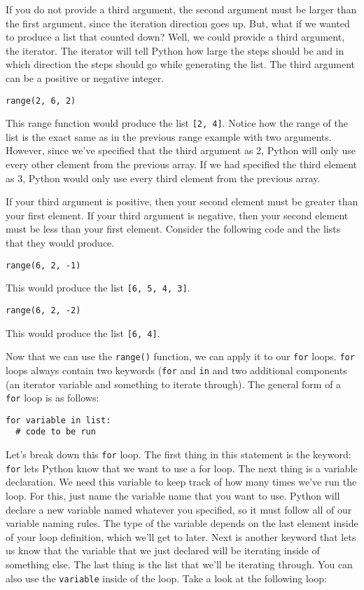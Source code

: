 If you do not provide a third argument, the second argument must be larger than the first argument, since the iteration direction goes up. But, what if we wanted to produce a list that counted down? Well, we could provide a third argument, the iterator. The iterator will tell Python how large the steps should be and in which direction the steps should go while generating the list. The third argument can be a positive or negative integer.\par
\begin{lstlisting}[style=pippython]
range(2, 6, 2)
\end{lstlisting}
This range function would produce the list \verb|[2, 4]|. Notice how the range of the list is the exact same as in the previous range example with two arguments. However, since we've specified that the third argument as 2, Python will only use every other element from the previous array. If we had specified the third element as 3, Python would only use every third element from the previous array.\par
If your third argument is positive, then your second element must be greater than your first element. If your third argument is negative, then your second element must be less than your first element. Consider the following code and the lists that they would produce.\par
\begin{lstlisting}[style=pippython]
range(6, 2, -1)
\end{lstlisting}
This would produce the list \verb|[6, 5, 4, 3]|.\par
\begin{lstlisting}[style=pippython]
range(6, 2, -2)
\end{lstlisting}
This would produce the list \verb|[6, 4]|.\par
Now that we can use the \verb|range()| function, we can apply it to our \verb|for| loops. \verb|for| loops always contain two keywords (\verb|for| and \verb|in| and two additional components (an iterator variable and something to iterate through). The general form of a \verb|for| loop is as follows:
\begin{lstlisting}
for variable in list:
  # code to be run
\end{lstlisting}
Let's break down this \verb|for| loop. The first thing in this statement is the keyword: \verb|for| lets Python know that we want to use a for loop. The next thing is a variable declaration. We need this variable to keep track of how many times we've run the loop. For this, just name the variable name that you want to use. Python will declare a new variable named whatever you specified, so it must follow all of our variable naming rules. The type of the variable depends on the last element inside of your loop definition, which we'll get to later. Next is another keyword that lets us know that the variable that we just declared will be iterating inside of something else. The last thing is the list that we'll be iterating through. You can also use the \verb|variable| inside of the loop. Take a look at the following loop:\par
